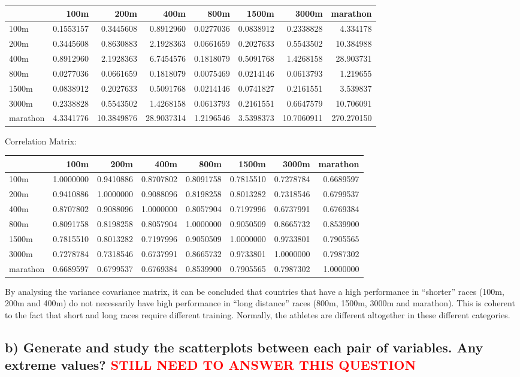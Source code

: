 \documentclass[]{article}
\begin{document}
\begin{longtable}[]{@{}lrrrrrrr@{}}
\toprule
& 100m & 200m & 400m & 800m & 1500m & 3000m & marathon\tabularnewline
\midrule
\endhead
100m & 0.1553157 & 0.3445608 & 0.8912960 & 0.0277036 & 0.0838912 &
0.2338828 & 4.334178\tabularnewline
200m & 0.3445608 & 0.8630883 & 2.1928363 & 0.0661659 & 0.2027633 &
0.5543502 & 10.384988\tabularnewline
400m & 0.8912960 & 2.1928363 & 6.7454576 & 0.1818079 & 0.5091768 &
1.4268158 & 28.903731\tabularnewline
800m & 0.0277036 & 0.0661659 & 0.1818079 & 0.0075469 & 0.0214146 &
0.0613793 & 1.219655\tabularnewline
1500m & 0.0838912 & 0.2027633 & 0.5091768 & 0.0214146 & 0.0741827 &
0.2161551 & 3.539837\tabularnewline
3000m & 0.2338828 & 0.5543502 & 1.4268158 & 0.0613793 & 0.2161551 &
0.6647579 & 10.706091\tabularnewline
marathon & 4.3341776 & 10.3849876 & 28.9037314 & 1.2196546 & 3.5398373 &
10.7060911 & 270.270150\tabularnewline
\bottomrule
\end{longtable}

Correlation Matrix:

\begin{longtable}[]{@{}lrrrrrrr@{}}
\toprule
& 100m & 200m & 400m & 800m & 1500m & 3000m & marathon\tabularnewline
\midrule
\endhead
100m & 1.0000000 & 0.9410886 & 0.8707802 & 0.8091758 & 0.7815510 &
0.7278784 & 0.6689597\tabularnewline
200m & 0.9410886 & 1.0000000 & 0.9088096 & 0.8198258 & 0.8013282 &
0.7318546 & 0.6799537\tabularnewline
400m & 0.8707802 & 0.9088096 & 1.0000000 & 0.8057904 & 0.7197996 &
0.6737991 & 0.6769384\tabularnewline
800m & 0.8091758 & 0.8198258 & 0.8057904 & 1.0000000 & 0.9050509 &
0.8665732 & 0.8539900\tabularnewline
1500m & 0.7815510 & 0.8013282 & 0.7197996 & 0.9050509 & 1.0000000 &
0.9733801 & 0.7905565\tabularnewline
3000m & 0.7278784 & 0.7318546 & 0.6737991 & 0.8665732 & 0.9733801 &
1.0000000 & 0.7987302\tabularnewline
marathon & 0.6689597 & 0.6799537 & 0.6769384 & 0.8539900 & 0.7905565 &
0.7987302 & 1.0000000\tabularnewline
\bottomrule
\end{longtable}

By analysing the variance covariance matrix, it can be concluded that
countries that have a high performance in ``shorter'' races (100m, 200m
and 400m) do not necessarily have high performance in ``long distance''
races (800m, 1500m, 3000m and marathon). This is coherent to the fact
that short and long races require different training. Normally, the
athletes are different altogether in these different categories.

\hypertarget{b-generate-and-study-the-scatterplots-between-each-pair-of-variables.-any-extreme-values}{%
\subsection{\texorpdfstring{b) Generate and study the scatterplots
between each pair of variables. Any extreme values?
\textcolor{red}{STILL NEED TO ANSWER THIS QUESTION}}{b) Generate and study the scatterplots between each pair of variables. Any extreme values? }}\label{b-generate-and-study-the-scatterplots-between-each-pair-of-variables.-any-extreme-values}}
\end{document}
